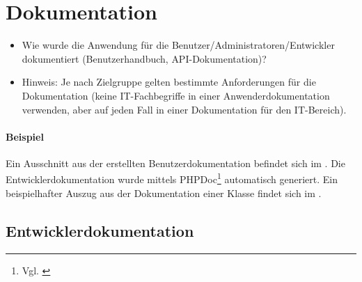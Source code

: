 \section{Dokumentation}
\label{sec:Dokumentation}

\begin{itemize}
	\item Wie wurde die Anwendung für die Benutzer/Administratoren/Entwickler dokumentiert (\zB Benutzerhandbuch, \acs{API}-Dokumentation)?
	\item Hinweis: Je nach Zielgruppe gelten bestimmte Anforderungen für die Dokumentation (\zB keine IT-Fachbegriffe in einer Anwenderdokumentation verwenden, aber auf jeden Fall in einer Dokumentation für den IT-Bereich).
\end{itemize}

\paragraph{Beispiel}
Ein Ausschnitt aus der erstellten Benutzerdokumentation befindet sich im .
Die Entwicklerdokumentation wurde mittels PHPDoc\footnote{Vgl. \cite{phpDoc}} automatisch generiert. Ein beispielhafter Auszug aus der Dokumentation einer Klasse findet sich im . 

\subsection{Entwicklerdokumentation}
\label{sec:Entwicklerdokumentation}